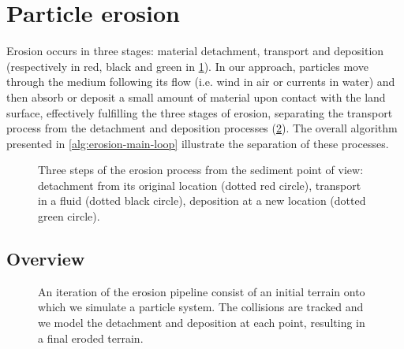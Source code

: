 \section{Particle erosion}
\label{sec:erosion-method}
Erosion occurs in three stages: material detachment, transport and deposition (respectively in red, black and green in \cref{fig:erosion-ablation_erosion}). In our approach, particles move through the medium following its flow (i.e. wind in air or currents in water) and then absorb or deposit a small amount of material upon contact with the land surface, effectively fulfilling the three stages of erosion, separating the transport process from the detachment and deposition processes (\cref{fig:erosion-pipeline-with-terrain}). The overall algorithm presented in \cref{alg:erosion-main-loop} illustrate the separation of these processes.

\begin{figure}
    \caption[Three steps of the erosion process from the sediment point of view]{Three steps of the erosion process from the sediment point of view: detachment from its original location (dotted red circle), transport in a fluid (dotted black circle), deposition at a new location (dotted green circle).}
    \label{fig:erosion-ablation_erosion}
\end{figure}

\subsection{Overview}

\begin{figure}
    \caption[An iteration of the erosion pipeline]{An iteration of the erosion pipeline consist of an initial terrain onto which we simulate a particle system. The collisions are tracked and we model the detachment and deposition at each point, resulting in a final eroded terrain. }
    \label{fig:erosion-pipeline-with-terrain}
\end{figure}

